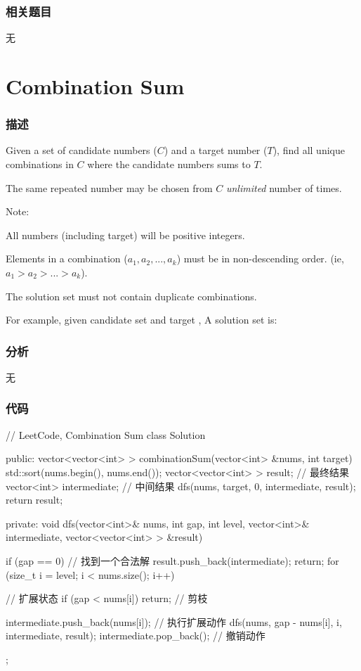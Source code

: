 \subsubsection{相关题目}
\begindot
\item 无
\myenddot


\section{Combination Sum} %
\label{sec:combination-sum}


\subsubsection{描述}
Given a set of candidate numbers ($C$) and a target number ($T$), find all unique combinations in $C$ where the candidate numbers sums to $T$.

The same repeated number may be chosen from $C$ \emph{unlimited} number of times.

Note:
\begindot
\item All numbers (including target) will be positive integers.
\item Elements in a combination ($a_1, a_2, ..., a_k$) must be in non-descending order. (ie, $a_1 > a_2 > ... > a_k$).
\item The solution set must not contain duplicate combinations.
\myenddot

For example, given candidate set  and target , 
A solution set is: 
\begin{Code}
[7] 
[2, 2, 3] 
\end{Code}


\subsubsection{分析}
无


\subsubsection{代码}
\begin{Code}
// LeetCode, Combination Sum
class Solution {
public:
    vector<vector<int> > combinationSum(vector<int> &nums, int target) {
        std::sort(nums.begin(), nums.end());
        vector<vector<int> > result; // 最终结果
        vector<int> intermediate; // 中间结果
        dfs(nums, target, 0, intermediate, result);
        return result;
    }

private:
    void dfs(vector<int>& nums, int gap, int level, vector<int>& intermediate,
            vector<vector<int> > &result) {
        if (gap == 0) {  // 找到一个合法解
            result.push_back(intermediate);
            return;
        }
        for (size_t i = level; i < nums.size(); i++) { // 扩展状态
            if (gap < nums[i]) return; // 剪枝

            intermediate.push_back(nums[i]); // 执行扩展动作
            dfs(nums, gap - nums[i], i, intermediate, result);
            intermediate.pop_back();  // 撤销动作
        }
    }
};
\end{Code}


